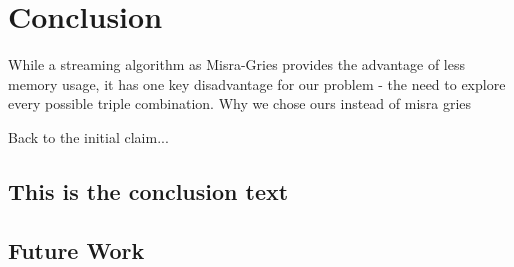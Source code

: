 \label{Conclusion}
\section{Conclusion}

While a streaming algorithm as Misra-Gries provides the advantage of less memory usage, it has one key disadvantage for our problem - the need to explore every possible triple combination.
Why we chose ours instead of misra gries



Back to the initial claim...
\subsection{This is the conclusion text}

\subsection{Future Work}